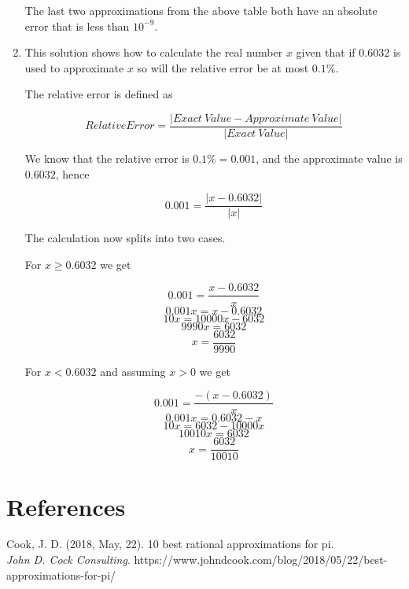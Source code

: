 \documentclass[10pt]{article}
\begin{document}
\begin{enumerate}
   The last two approximations from the above table both have an absolute error that is less than \( 10^{-9} \).

   \item This solution shows how to calculate the real number \( x \) given that if \( 0.6032 \) is used to approximate \( x \) so will the relative error be at most \( 0.1\% \).
   
   The relative error is defined as
   
   \[ Relative Error = \dfrac{\left| Exact \: Value - Approximate \: Value \right|}{\left| Exact \: Value\right|}\]
   
    We know that the relative error is \( 0.1\% = 0.001 \), and the approximate value is \( 0.6032 \), hence   
   
    \[ 0.001 = \dfrac{ \left| x - 0.6032 \right| }{ \left| x \right| } \]

    The calculation now splits into two cases.

    For \( x \geq 0.6032 \) we get

    \[ 0.001 = \dfrac{ x - 0.6032 }{ x } \]
    \[ 0.001x =  x - 0.6032 \]
    \[ 10x =  10000x - 6032 \]
    \[ 9990x = 6032 \]
    \[ x = \dfrac{6032}{9990} \]
      
    For \( x < 0.6032 \) and assuming \( x > 0 \) we get

    \[ 0.001 = \dfrac{ -(x - 0.6032) }{ x } \]
    \[ 0.001x = 0.6032 - x \]
    \[ 10x =  6032 - 10000x \]
    \[ 10010x = 6032 \]
    \[ x = \dfrac{6032}{10010} \]

\end{enumerate}

\section{References}

Cook, J. D. (2018, May, 22). 10 best rational approximations for pi.\\
\textit{John D. Cock Consulting}. https://www.johndcook.com/blog/2018/05/22/best-approximations-for-pi/
\end{document}
